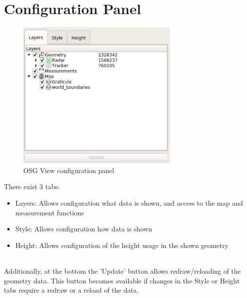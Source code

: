 \section{Configuration Panel}
\label{sec:osgview_config_panel}

\begin{figure}[H]
    \includegraphics[width=8cm,frame]{../screenshots/osgview_config_panel.png}
  \caption{OSG View configuration panel}
\end{figure}

There exist 3 tabs:
\begin{itemize}
 \item Layers: Allows configuration what data is shown, and access to the map and measurement functions
 \item Style: Allows configuration how data is shown
 \item Height: Allows configuration of the height usage in the shown geometry
\end{itemize}
\ \\

Additionally, at the bottom the 'Update' button allows redraw/reloading of the geometry data. This button becomes available if changes in the Style or Height tabs require a redraw or a reload of the data. \\


 
 
